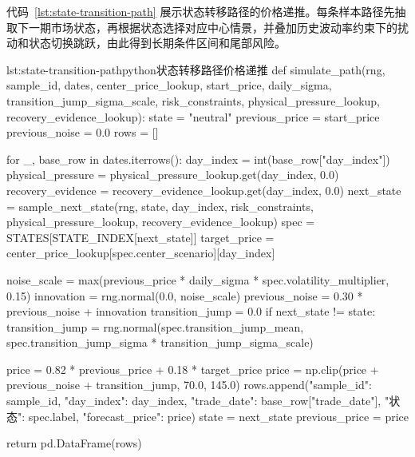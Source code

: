 代码~\ref{lst:state-transition-path} 展示状态转移路径的价格递推。每条样本路径先抽取下一期市场状态，再根据状态选择对应中心情景，并叠加历史波动率约束下的扰动和状态切换跳跃，由此得到长期条件区间和尾部风险。

\begin{paperlisting}{lst:state-transition-path}{python}{状态转移路径价格递推}
def simulate_path(rng, sample_id, dates, center_price_lookup, start_price,
                  daily_sigma, transition_jump_sigma_scale, risk_constraints,
                  physical_pressure_lookup, recovery_evidence_lookup):
    state = "neutral"
    previous_price = start_price
    previous_noise = 0.0
    rows = []

    for _, base_row in dates.iterrows():
        day_index = int(base_row["day_index"])
        physical_pressure = physical_pressure_lookup.get(day_index, 0.0)
        recovery_evidence = recovery_evidence_lookup.get(day_index, 0.0)
        next_state = sample_next_state(rng, state, day_index, risk_constraints,
                                       physical_pressure_lookup,
                                       recovery_evidence_lookup)
        spec = STATES[STATE_INDEX[next_state]]
        target_price = center_price_lookup[spec.center_scenario][day_index]

        noise_scale = max(previous_price * daily_sigma
                          * spec.volatility_multiplier, 0.15)
        innovation = rng.normal(0.0, noise_scale)
        previous_noise = 0.30 * previous_noise + innovation
        transition_jump = 0.0
        if next_state != state:
            transition_jump = rng.normal(spec.transition_jump_mean,
                                         spec.transition_jump_sigma
                                         * transition_jump_sigma_scale)

        price = 0.82 * previous_price + 0.18 * target_price
        price = np.clip(price + previous_noise + transition_jump, 70.0, 145.0)
        rows.append({"sample_id": sample_id, "day_index": day_index,
                     "trade_date": base_row["trade_date"], "状态": spec.label,
                     "forecast_price": price})
        state = next_state
        previous_price = price

    return pd.DataFrame(rows)
\end{paperlisting}

\clearpage
